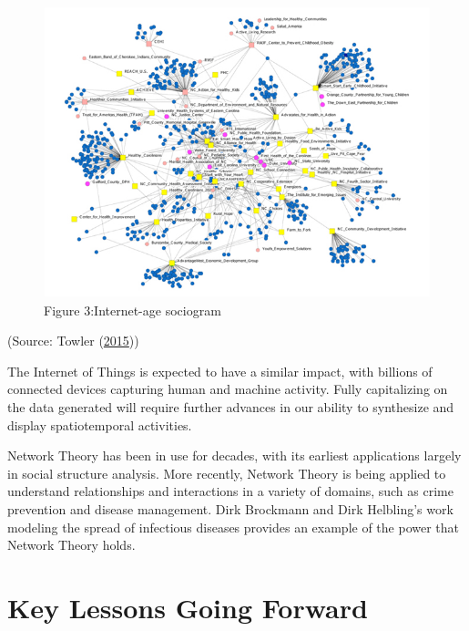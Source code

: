 \documentclass[]{book}
\theoremstyle{definition}
\theoremstyle{definition}
\theoremstyle{definition}
\theoremstyle{remark}
\begin{document}
\begin{figure}
\centering
\includegraphics{images/InternetAge.jpg}
\caption{Figure 3:Internet-age sociogram}
\end{figure}

(Source: Towler (\protect\hyperlink{ref-future_viz}{2015}))

The Internet of Things is expected to have a similar impact, with
billions of connected devices capturing human and machine activity.
Fully capitalizing on the data generated will require further advances
in our ability to synthesize and display spatiotemporal activities.

Network Theory has been in use for decades, with its earliest
applications largely in social structure analysis. More recently,
Network Theory is being applied to understand relationships and
interactions in a variety of domains, such as crime prevention and
disease management. Dirk Brockmann and Dirk Helbling's work modeling the
spread of infectious diseases provides an example of the power that
Network Theory holds.

\section{Key Lessons Going Forward}\label{key-lessons-going-forward}
\end{document}
